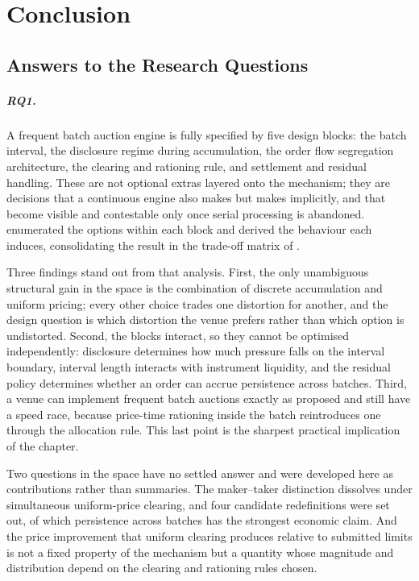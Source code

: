 \chapter{Conclusion}
\label{ch:conclusion}

\section{Answers to the Research Questions}

\paragraph{RQ1.} A frequent batch auction engine is fully specified by
five design blocks: the batch interval, the disclosure regime during
accumulation, the order flow segregation architecture, the clearing and
rationing rule, and settlement and residual handling. These are not
optional extras layered onto the mechanism; they are decisions that a
continuous engine also makes but makes implicitly, and that become
visible and contestable only once serial processing is abandoned.
 enumerated the options within each block and derived
the behaviour each induces, consolidating the result in the trade-off
matrix of .

Three findings stand out from that analysis. First, the only unambiguous
structural gain in the space is the combination of discrete accumulation
and uniform pricing; every other choice trades one distortion for
another, and the design question is which distortion the venue prefers
rather than which option is undistorted. Second, the blocks interact, so
they cannot be optimised independently: disclosure determines how much
pressure falls on the interval boundary, interval length interacts with
instrument liquidity, and the residual policy determines whether an
order can accrue persistence across batches. Third, a venue can
implement frequent batch auctions exactly as proposed and still have a
speed race, because price-time rationing inside the batch reintroduces
one through the allocation rule. This last point is the sharpest
practical implication of the chapter.

Two questions in the space have no settled answer and were developed
here as contributions rather than summaries. The maker--taker
distinction dissolves under simultaneous uniform-price clearing, and
four candidate redefinitions were set out, of which persistence across
batches has the strongest economic claim. And the price improvement that
uniform clearing produces relative to submitted limits is not a fixed
property of the mechanism but a quantity whose magnitude and
distribution depend on the clearing and rationing rules chosen.

